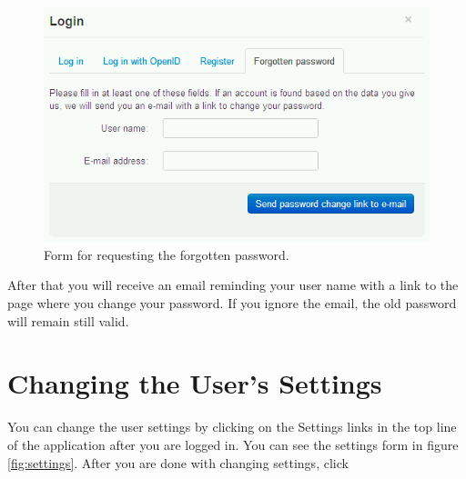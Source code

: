 \begin{figure}
\begin{center}
\includegraphics[scale=0.4]{figures/user_manual/forgotten_password.png}
\end{center}
\caption{Form for requesting the forgotten password.}
\label{fig:forgotten_pass}
\end{figure}

After that you will receive an email reminding your user name with a link to the page where you change your password. If you ignore the email, the old password will remain still valid.

\section{Changing the User's Settings}
\label{sec:settings}

You can change the user settings by clicking on the Settings links in the top line of the application after you are logged in. You can see the settings form in figure \ref{fig:settings}. After you are done with changing settings, click 

